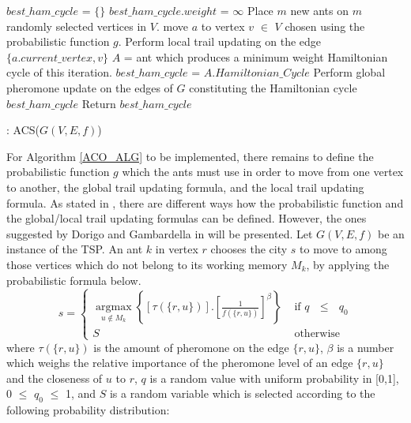 \documentclass{article}
\DeclareMathOperator*{\argmax}{argmax}
\begin{document}
\begin{algorithm}[H]
\begin{algorithmic}[1]
\State $best\_ham\_cycle$ = $\{\}$
\State $best\_ham\_cycle.weight$ = $\infty$
          \State Place $m$ new ants on $m$ randomly selected vertices in $V$.
			\State move $a$ to vertex $v$ $\in$ $V$ chosen using the probabilistic function $g$.
			\State Perform local trail updating on the edge $\{a.current\_vertex, v\}$
		\EndFor
	\EndWhile
	\State $A$ = ant which produces a minimum weight Hamiltonian cycle of this iteration.
		\State $best\_ham\_cycle$ = $A.Hamiltonian\_Cycle$
	\EndIf
           \State Perform global pheromone update on the edges of $G$ constituting the Hamiltonian cycle $best\_ham\_cycle$
\EndWhile
\State Return $best\_ham\_cycle$
\caption{: ACS($G(V,E,f)$)}
\label{ACO_ALG}
\end{algorithmic}
\end{algorithm}
For Algorithm \ref{ACO_ALG} to be implemented, there remains to define the probabilistic function $g$ which the ants must use in order to move from one vertex to another, the global trail updating formula, and the local trail updating formula. As stated in \cite{dorigo_gambardella_1997}, there are different ways how the probabilistic function and the global/local trail updating formulas can be defined. However, the ones suggested by Dorigo and Gambardella in \cite{dorigo_gambardella_1997} will be presented. Let $G(V,E,f)$ be an instance of the TSP. An ant $k$ in vertex $r$ chooses the city $s$ to move to among those vertices which do not belong to its working memory $M_k$, by applying the probabilistic formula below.
\begin{equation}
  \label{eq:aco1}
  s=\begin{cases}
            \displaystyle{\argmax\limits_{u \notin M_k} \left\{[\tau(\{r,u\})].\left[\frac{1}{f(\{r,u\})}\right]^\beta \right\}} &\text{   if $q$ $\leq$ $q_0$}\\ 
             S &\text{ 	otherwise}
            \end{cases}
\end{equation}
where $\tau(\{r,u\})$ is the amount of pheromone on the edge $\{r,u\}$, $\beta$ is a number which weighs the relative importance of the pheromone level of an edge $\{r,u\}$ and the closeness of $u$ to $r$, $q$ is a random value with uniform probability in [0,1], 0 $\leq$ $q_0$ $\leq$ 1, and $S$ is a random variable which is selected according to the following probability distribution:
\end{document}
